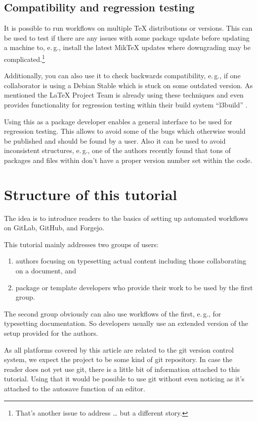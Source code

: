 \documentclass[final]{ltugboat}
\newcommand*{\TeXLive}{\acro{\TeX\,Live}\xspace}
\begin{document}
\subsection{Compatibility and regression testing}
It is possible to run workflows on multiple \TeX{} distributions or versions.
This can be used to test if there are any issues with some package update before updating a machine to, e.\,g., install the latest MikTeX updates where downgrading may be complicated.\footnote{That's another issue to address … but a different story.}

Additionally, you can also use it to check backwards compatibility, e.\,g., if one collaborator is using a Debian Stable which is stuck on some outdated version.
As mentioned the \LaTeX{} Project Team is already using these techniques and even provides functionality for regression testing within their build system \enquote{l3build} \cite{l3build}.

Using this as a package developer enables a general interface to be used for regression testing.
This allows to avoid some of the bugs which otherwise would be published and should be found by a user.
Also it can be used to avoid inconsistent structures, e.\,g., one of the authors recently found that tons of packages and files within \TeXLive{} don't have a proper version number set within the code.

\section{Structure of this tutorial}

The idea is to introduce readers to the basics of setting up automated workflows on GitLab, GitHub, and Forgejo.

This tutorial mainly addresses two groups of users:

\begin{enumerate}
\item authors focusing on typesetting actual content including those collaborating on a document, and
\item package or template developers who provide their work to be used by the first group.
\end{enumerate}

The second group obviously can also  use workflows of the first, e.\,g., for typesetting documentation.
So developers usually use an extended version of the setup provided for the authors.

As all platforms covered by this article are related to the git version control system, we expect the project to be some kind of git repository.
In case the reader does not yet use git, there is a little bit of information attached to this tutorial.
Using that it would be possible to use git without even noticing as it's attached to the autosave function of an editor.
\end{document}
